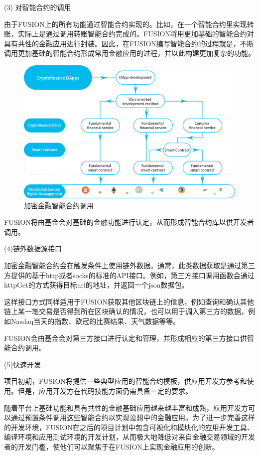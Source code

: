 \documentclass[a4paper,12pt]{article}
\begin{document}
(3) 对智能合约的调用

由于FUSION上的所有功能通过智能合约实现的。比如，在一个智能合约里实现转账，实际上是通过调用转账智能合约完成的。FUSION将用更加基础的智能合约对具有共性的金融应用进行封装。因此，在FUSION编写智能合约的过程就是，不断调用更加基础的智能合约形成常用金融应用的过程，并以此构建更加复杂的功能。

\begin{figure}[htbp]
\centering\includegraphics[width=5in]{pic/sccalling.png}
\caption{加密金融智能合约调用}\label{fig:1}
\end{figure}

FUSION将由基金会对基础的金融功能进行认定，从而形成智能合约库以供开发者调用。

(4)链外数据源接口

加密金融智能合约会在触发条件上使用链外数据。通常，此类数据获取是通过第三方提供的基于http或者socks的标准的API接口。例如，第三方接口调用函数会通过httpGet的方式获得目标url的地址，并返回一个json数据包。

这样接口方式同样适用于FUSION获取其他区块链上的信息，例如查询和确认其他链上某一笔交易是否得到所在区块确认的情况，也可以用于调入第三方的数据，例如Nasdaq当天的指数、欧冠的比赛结果、天气数据等等。

FUSION会由基金会对第三方接口进行认定和管理，并形成相应的第三方接口供智能合约调用。

(5)快速开发

项目初期，FUSION将提供一些典型应用的智能合约模板，供应用开发方参考和使用。但是，应用开发方在代码技能方面仍需具备一定的要求。

随着平台上基础功能和具有共性的金融基础应用越来越丰富和成熟，应用开发方可以通过预置条件调用这些智能合约以实现设想中的金融应用。为了进一步完善这样的开发环境，FUSION在之后的项目计划中包含可视化和模块化的应用开发工具、编译环境和应用测试环境的开发计划，从而极大地降低对来自金融交易领域的开发者的开发门槛，使他们可以聚焦于在FUSION上实现金融应用的创新。
\end{document}
